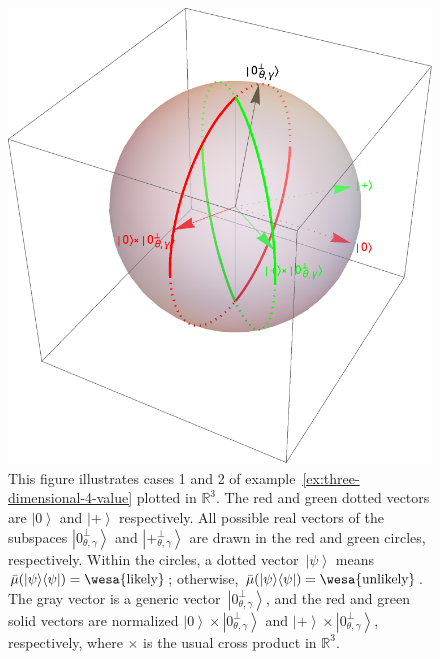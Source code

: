 \documentclass{article}
\theoremstyle{remark}
\newcommand{\likely}{{\mbox{\wesa{likely}}}}
\newcommand{\unlikely}{{\mbox{\wesa{unlikely}}}}
\newcommand{\ket}[1]{{\left\vert{#1}\right\rangle}}
\newcommand{\op}[2]{\ensuremath{\left\vert{#1}\middle\rangle\middle\langle{#2}\right\vert}}
\newcommand{\proj}[1]{\op{#1}{#1}}
\newcommand{\ps}{\texttt{+}}
\begin{document}
\begin{figure}
\begin{centering}
\includegraphics[scale=0.38]{../proposal/measure4} 
\par\end{centering}
\caption{\label{fig:three-dimensional-4-value}This figure illustrates cases
1 and 2 of example~\ref{ex:three-dimensional-4-value} plotted in
$\mathbb{R}^{3}$. The red and green dotted vectors are $\ket{0}$
and $\ket{\ps}$ respectively. All possible real vectors of the subspaces
$\ket{0_{\theta,\gamma}^{\perp}}$ and $\ket{\ps_{\theta,\gamma}^{\perp}}$
are drawn in the red and green circles, respectively. Within the circles,
a dotted vector~$\ket{\psi}$ means $\bar{\mu}(\proj{\psi})=\likely$;
otherwise, $\bar{\mu}(\proj{\psi})=\unlikely$. The gray vector is
a generic vector~$\ket{0_{\theta,\gamma}^{\perp}}$, and the red
and green solid vectors are normalized $\ket{0}\times\ket{0_{\theta,\gamma}^{\perp}}$
and $\ket{\ps}\times\ket{0_{\theta,\gamma}^{\perp}}$, respectively,
where $\times$ is the usual cross product in $\mathbb{R}^{3}$.}
\end{figure}
\end{document}
